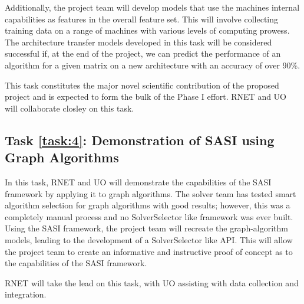 Additionally, the project team will develop models that use the machines internal capabilities as features in the overall feature set. This will involve collecting training data on a range of machines with various levels of computing prowess. The architecture transfer models developed in this task will be considered successful if, at the end of the project, we can predict the performance of an algorithm for a given matrix on a new architecture with an accuracy of over 90\%. 
 
This task constitutes the major novel scientific contribution of the proposed project and is expected to form the bulk of the Phase I effort.  RNET and UO will collaborate closley on this task. 

\label{task:4}
\subsection{Task \ref{task:4}: Demonstration of SASI using Graph Algorithms }

In this task, RNET and UO will demonstrate the capabilities of the SASI framework by applying 
it to graph algorithms. The solver team has tested smart algorithm selection for graph algorithms 
with good results; however, this was a completely manual process and no SolverSelector like framework was ever built. Using 
the SASI framework, the project team will recreate the graph-algorithm models, leading to the development of a SolverSelector
like API. This will allow the project team to create an informative and instructive proof of concept as to the capabilities 
of the SASI framework. 

RNET will take the lead on this task, with UO assisting with data collection and integration. 
